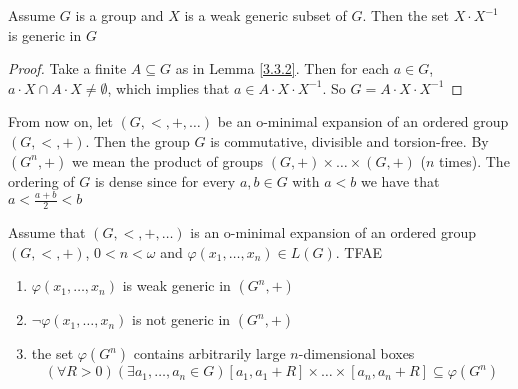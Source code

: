 \documentclass[11pt]{article}
\begin{document}
\begin{corollary}[]
\label{3.3.3}
Assume \(G\) is a group and \(X\) is a weak generic subset of \(G\). Then the set \(X\cdot X^{-1}\)
is generic in \(G\)
\end{corollary}

\begin{proof}
Take a finite \(A\subseteq G\) as in Lemma \ref{3.3.2}. Then for each \(a\in G\), \(a\cdot X\cap A\cdot X\neq\emptyset\), which
implies that \(a\in A\cdot X\cdot X^{-1}\). So \(G=A\cdot X\cdot X^{-1}\)
\end{proof}

From now on, let \((G,<,+,\dots)\) be an o-minimal expansion of an ordered group \((G,<,+)\). Then
the group \(G\) is commutative, divisible and torsion-free. By \((G^n,+)\) we mean the product of
groups \((G,+)\times\dots\times(G,+)\) (\(n\) times). The ordering of \(G\) is dense since for
every \(a,b\in G\) with \(a<b\) we have that \(a<\frac{a+b}{2}<b\)

\begin{theorem}[3.3.4]
\label{3.3.4}
Assume that \((G,<,+,\dots)\) is an o-minimal expansion of an ordered group \((G,<,+)\), \(0<n<\omega\)
and \(\varphi(x_1,\dots,x_n)\in L(G)\). TFAE
\begin{enumerate}
\item \(\varphi(x_1,\dots,x_n)\) is weak generic in \((G^n,+)\)
\item \(\neg\varphi(x_1,\dots,x_n)\) is not generic in \((G^n,+)\)
\item the set \(\varphi(G^n)\) contains arbitrarily large \(n\)-dimensional boxes
\begin{equation*}
(\forall R>0)(\exists a_1,\dots,a_n\in G)[a_1,a_1+R]\times\dots\times[a_n,a_n+R]\subseteq\varphi(G^n)
\end{equation*}
\end{enumerate}
\end{theorem}
\end{document}
